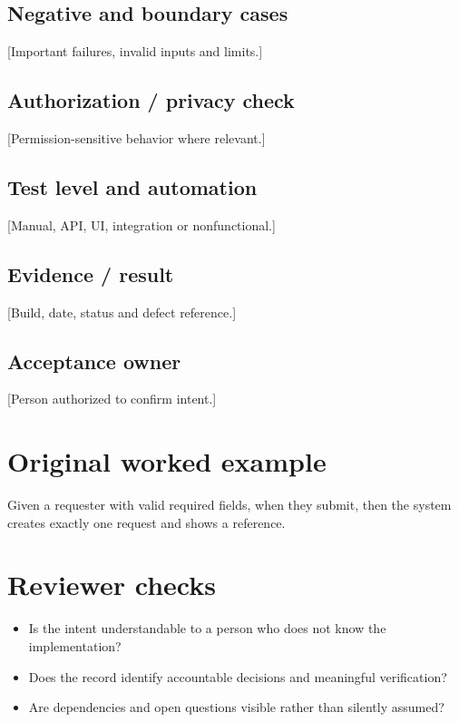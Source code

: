\documentclass[11pt,letterpaper]{article}
\begin{document}
\subsection{Negative and boundary cases}
[Important failures, invalid inputs and limits.]

\subsection{Authorization / privacy check}
[Permission-sensitive behavior where relevant.]

\subsection{Test level and automation}
[Manual, API, UI, integration or nonfunctional.]

\subsection{Evidence / result}
[Build, date, status and defect reference.]

\subsection{Acceptance owner}
[Person authorized to confirm intent.]

\section{Original worked example}
\begin{tcolorbox}[colback=tealback,colframe=navy,title={Illustrative entry},breakable]
Given a requester with valid required fields, when they submit, then the system creates exactly one request and shows a reference.

\end{tcolorbox}
\section{Reviewer checks}
\begin{itemize}[leftmargin=*,itemsep=2pt]
\item Is the intent understandable to a person who does not know the implementation?
\item Does the record identify accountable decisions and meaningful verification?
\item Are dependencies and open questions visible rather than silently assumed?
\end{itemize}
\end{document}
